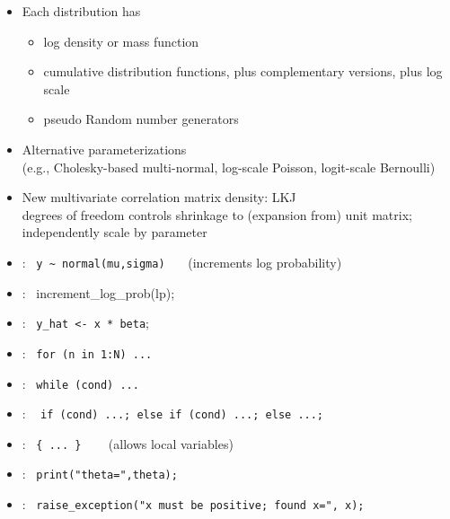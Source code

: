 \documentclass[10pt]{report}
\newcommand{\sld}[1]{\newpage{\noindent\LARGE \ \ \
    \textcolor{MidnightBlue}{\bfseries #1}}\vspace*{4pt}}
\newcommand{\code}[1]{{\tt #1}}
\newcommand{\myemph}[1]{{\color{MidnightBlue}{\bfseries #1}}}
\begin{document}
\sld{Distribution Library}

\begin{itemize}
\item Each distribution has
\vspace*{-4pt}
\begin{itemize}\small
\item log density or mass function
\item cumulative distribution functions, plus complementary versions,
  plus log scale
\item pseudo Random number generators
\end{itemize}
\item Alternative parameterizations
\\
{\footnotesize (e.g., Cholesky-based multi-normal,
log-scale Poisson, logit-scale Bernoulli)}
\item New multivariate correlation matrix density: LKJ
\\
{\footnotesize degrees of freedom controls 
shrinkage to (expansion from) unit matrix; \\
independently scale by parameter}
\end{itemize}

\sld{Statements}
\vspace*{-2pt}
\begin{itemize}
\item \myemph{Sampling}: \ {\footnotesize \Verb|y ~ normal(mu,sigma)|}
\ \ \ {\footnotesize (increments log probability)}
%
\item \myemph{Log probability}: \ {\footnotesize increment\_log\_prob(lp);}
\item \myemph{Assignment}: \  {\footnotesize \code{y\_hat <- x * beta};}
%
\item \myemph{For loop}: \ {\footnotesize \code{for (n in 1:N) ...}}
%
\item \myemph{While loop}: \ {\footnotesize \code{while (cond) ...}}
%
\item \myemph{Conditional}: \ {\footnotesize
\code{if (cond) ...; else if (cond) ...;  else ...;}}
\item \myemph{Block}: \ {\footnotesize \Verb|{ ... }|}  \ \ \ {\footnotesize
   (allows local variables)}
\item \myemph{Print}: \ {\footnotesize \code{print("theta=",theta);}}
\item \myemph{Throw}: \ {\footnotesize \code{raise\_exception("x must be
    positive; found x=", x);}}
\end{itemize}
\end{document}

